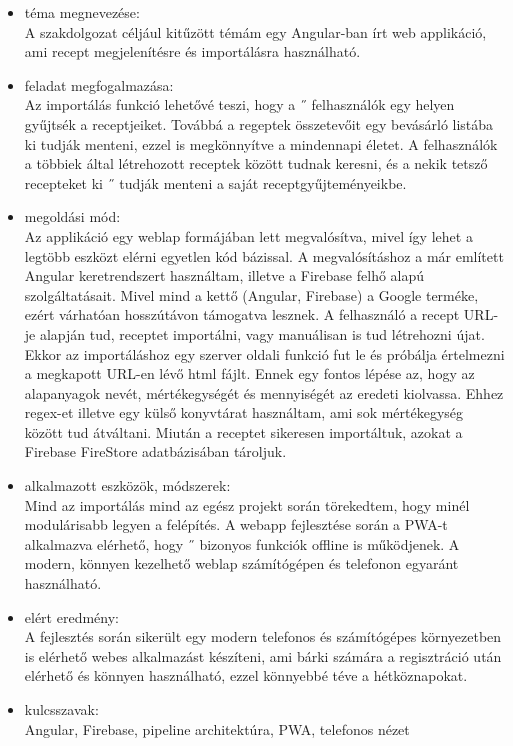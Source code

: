 \documentclass[12pt]{report}
\theoremstyle{definition}
\begin{document}
\begin{itemize}
	\item téma megnevezése: \\
	      A szakdolgozat céljául kitűzött témám egy Angular-ban írt web applikáció, ami recept megjelenítésre és importálásra használható.
	\item feladat megfogalmazása: \\
	      Az importálás funkció lehetővé teszi, hogy a ˝ felhasználók egy helyen gyűjtsék a receptjeiket. Továbbá a regeptek összetevőit egy bevásárló listába ki tudják menteni, ezzel is megkönnyítve a mindennapi életet. A felhasználók a többiek által létrehozott receptek között tudnak keresni, és a nekik tetsző recepteket ki ˝ tudják menteni a saját receptgyűjteményeikbe.
	\item megoldási mód: \\
	      Az applikáció egy weblap formájában lett megvalósítva, mivel így lehet a legtöbb eszközt elérni egyetlen kód bázissal. A megvalósításhoz a már említett Angular keretrendszert használtam, illetve a Firebase felhő alapú szolgáltatásait. Mivel mind a kettő (Angular, Firebase) a Google terméke, ezért várhatóan hosszútávon támogatva lesznek. A felhasználó a recept URL-je alapján tud, receptet importálni, vagy manuálisan is tud létrehozni újat. Ekkor az importáláshoz egy szerver oldali funkció fut le és próbálja értelmezni a megkapott URL-en lévő html fájlt. Ennek egy fontos lépése az, hogy az alapanyagok nevét, mértékegységét és mennyiségét az eredeti kiolvassa. Ehhez regex-et illetve egy külső konyvtárat használtam, ami sok mértékegység között tud átváltani. Miután a receptet sikeresen importáltuk, azokat a Firebase FireStore adatbázisában tároljuk.
	\item alkalmazott eszközök, módszerek: \\
	      Mind az importálás mind az egész projekt során törekedtem, hogy minél modulárisabb legyen a felépítés. A webapp fejlesztése során a PWA-t alkalmazva elérhető, hogy ˝ bizonyos funkciók offline is működjenek. A modern, könnyen kezelhető weblap számítógépen és telefonon egyaránt használható.
	\item elért eredmény: \\
	      A fejlesztés során sikerült egy modern telefonos és számítógépes környezetben is elérhető webes alkalmazást készíteni, ami bárki számára a regisztráció után elérhető és könnyen használható, ezzel könnyebbé téve a hétköznapokat.
	\item kulcsszavak: \\
	      Angular, Firebase, pipeline architektúra, PWA, telefonos nézet
\end{itemize}
\end{document}
